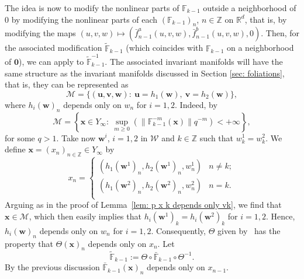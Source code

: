 \documentclass[reqno, a4paper, 10pt]{amsart}
\theoremstyle{plain}
\numberwithin{equation}{section}
\theoremstyle{remark}
\begin{document}
The idea is now to modify the nonlinear parts
of $\mathbb F_{k-1}$ outside a neighborhood of $0$ by modifying the nonlinear parts of each $(\mathbb F_{k-1})_n$, $n\in\mathbb{Z}$ on $\mathbb{R}^d$, that is, by modifying the maps $(u, v, w)\mapsto (\bar f_{n-1}^a(u, v, w), \bar f_{n-1}^b(u, v, w), 0)$.
Then, for the associated modification $\tilde{\mathbb F}_{k-1}$ (which coincides with $\mathbb F_{k-1}$ on a neighborhood of $\mathbf 0$), we can apply \cite[Theorem 2]{dLW} to $\tilde{\mathbb F}_{k-1}^{-1}$.%
The associated invariant manifolds will have the same structure as the invariant manifolds discussed in Section \ref{sec: foliations}, 
that is, they can be represented as
\[
\mathcal M=\{(\mathbf u, \mathbf v, \mathbf w): \ \mathbf u=h_1(\mathbf w), \ \mathbf v=h_2(\mathbf w)\},
\]
where $h_i(\mathbf w)_n$ depends only on $w_n$ for $i=1, 2$. Indeed, by~\cite[Theorem 2.1]{dLW} 
\[
\mathcal M=\left \{\mathbf x\in Y_\infty: \ \sup_{m\ge 0}(\|\mathbb F_{k-1}^{-m}(\mathbf x)\|q^{-m})<+\infty \right \},
\]
for some $q>1$. Take now $\mathbf w^i$, $i=1, 2$ in $\mathcal W$ and $k\in \mathbb Z$ such that $w_k^1=w_k^2$. We define $\mathbf x=(x_n)_{n\in \mathbb Z}\in Y_\infty$ by
\[
x_n=\begin{cases}
(h_1(\mathbf w^1)_n, h_2(\mathbf w^1)_n, w_n^1) & n\neq k;\\
(h_1(\mathbf w^2)_n, h_2(\mathbf w^2)_n, w_n^2) & n= k.\\
\end{cases}
\]
Arguing as in the proof of Lemma~\ref{lem: p x k depends only vk}, we find that $\mathbf x\in \mathcal M$, which then easily implies that $h_i(\mathbf w^1)_k=h_i(\mathbf w^2)_k$ for $i=1, 2$. Hence, $h_i(\mathbf w)_n$ depends only on $w_n$ for $i=1, 2$.
Consequently, $\Theta$ given by~\cite[Eq. (5.21)]{ZZJ} has the property that $\Theta(\mathbf x)_n$ depends only on $x_n$. Let
\[
\tilde{\mathbb F}_{k-1}:=\Theta\circ \bar{\mathbb F}_{k-1}\circ \Theta^{-1}.
\]
By the previous discussion $\bar{\mathbb F}_{k-1}(\mathbf x)_n$ depends only on $x_{n-1}$. 
\end{document}
